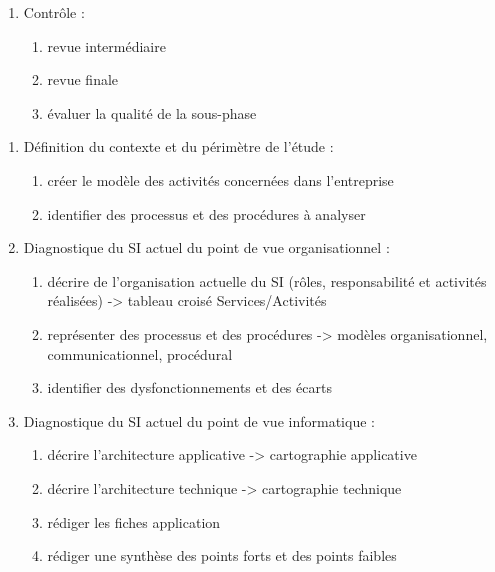 \begin{enumerate}
          \begin{enumerate}
            \item Contrôle :
                \begin{enumerate}
                  \item revue intermédiaire 
                  \item revue finale 
                  \item évaluer la qualité de la sous-phase 
                \end{enumerate}
          \end{enumerate}

          \begin{enumerate}
            \item Définition du contexte et du périmètre de l'étude :
                \begin{enumerate}
                  \item créer le modèle des activités concernées dans l'entreprise
                  \item  identifier des processus et des procédures à analyser
                \end{enumerate}
            \item Diagnostique du SI actuel du point de vue organisationnel : 
                \begin{enumerate}
                  \item décrire de l'organisation actuelle du SI (rôles, responsabilité et activités réalisées) -> tableau croisé Services/Activités 
                  \item représenter des processus et des procédures -> modèles organisationnel, communicationnel, procédural 
                  \item identifier des dysfonctionnements et des écarts
                \end{enumerate}
            \item Diagnostique du SI actuel du point de vue informatique : 
                \begin{enumerate}
                  \item décrire l'architecture applicative -> cartographie applicative
                  \item décrire l'architecture technique -> cartographie technique 
                  \item rédiger les fiches application
                  \item rédiger une synthèse des points forts et des points faibles

\end{enumerate}
\end{enumerate}
\end{enumerate}
